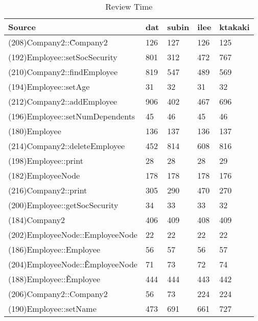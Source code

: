 \begin{table}[hb]
\begin{center}
\begin{tabular}{|l|l|l|l|l|}
\hline
Source & dat & subin & ilee & ktakaki\\
\hline
(208)Company2::\~Company2 & 126 & 127 & 126 & 125\\
(192)Employee::setSocSecurity & 801 & 312 & 472 & 767\\
(210)Company2::findEmployee & 819 & 547 & 489 & 569\\
(194)Employee::setAge & 31 & 32 & 31 & 32\\
(212)Company2::addEmployee & 906 & 402 & 467 & 696\\
(196)Employee::setNumDependents & 45 & 46 & 45 & 46\\
(180)Employee & 136 & 137 & 136 & 137\\
(214)Company2::deleteEmployee & 452 & 814 & 608 & 816\\
(198)Employee::print & 28 & 28 & 28 & 29\\
(182)EmployeeNode & 178 & 178 & 178 & 176\\
(216)Company2::print & 305 & 290 & 470 & 270\\
(200)Employee::getSocSecurity & 34 & 33 & 33 & 32\\
(184)Company2 & 406 & 409 & 408 & 409\\
(202)EmployeeNode::EmployeeNode & 22 & 22 & 22 & 22\\
(186)Employee::Employee & 56 & 57 & 56 & 57\\
(204)EmployeeNode::\~EmployeeNode & 71 & 73 & 72 & 74\\
(188)Employee::\~Employee & 444 & 444 & 443 & 442\\
(206)Company2::Company2 & 56 & 73 & 224 & 224\\
(190)Employee::setName & 473 & 691 & 661 & 727\\
\hline
\end{tabular}
\end{center}
\caption{Review Time}
\end{table}


